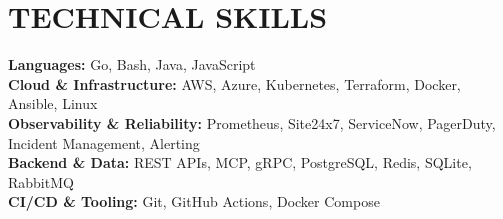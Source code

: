 \section{TECHNICAL SKILLS}

\textbf{Languages:} Go, Bash, Java, JavaScript\\
\textbf{Cloud \& Infrastructure:} AWS, Azure, Kubernetes, Terraform, Docker, Ansible, Linux\\
\textbf{Observability \& Reliability:} Prometheus, Site24x7, ServiceNow, PagerDuty, Incident Management, Alerting\\
\textbf{Backend \& Data:} REST APIs, MCP, gRPC, PostgreSQL, Redis, SQLite, RabbitMQ\\
\textbf{CI/CD \& Tooling:} Git, GitHub Actions, Docker Compose
